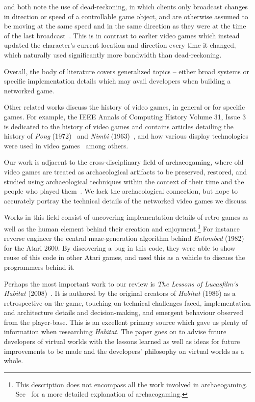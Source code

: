 \citet{Das1997NetEffect} and \citet{Blau1992NetworkedEnvironments} both note the use of dead-reckoning, in which clients only broadcast changes in direction or speed of a controllable game object, and are otherwise assumed to be moving at the same speed and in the same direction as they were at the time of the last broadcast~\cite{Blau1992NetworkedEnvironments}. This is in contrast to earlier video games which instead updated the character's current location and direction every time it changed, which naturally used significantly more bandwidth than dead-reckoning.

Overall, the body of literature covers generalized topics -- either broad systems or specific implementation details which may avail developers when building a networked game.

Other related works discuss the history of video games, in general or for specific games. For example, the IEEE Annals of Computing History Volume 31, Issue 3 is dedicated to the history of video games and contains articles detailing the history of \textit{Pong} (1972)~\cite{lowood} and \textit{Nimbi} (1963)~\cite{jorgensen}, and how various display technologies were used in video games~\cite{bogost} among others.

Our work is adjacent to the cross-disciplinary field of archaeogaming, where old video games are treated as archaeological artifacts to be preserved, restored, and studied using archaeological techniques within the context of their time and the people who played them~\cite{aycock}. We lack the archaeological connection, but hope to accurately portray the technical details of the networked video games we discuss.

Works in this field consist of uncovering implementation details of retro games as well as the human element behind their creation and enjoyment.\footnote{This description does not encompass all the work involved in archaeogaming. See~\cite{aycock} for a more detailed explanation of archaeogaming.}
For instance \citet{Aycock2018} reverse engineer the central maze-generation algorithm behind \textit{Entombed} (1982) for the Atari 2600. By discovering a bug in this code, they were able to show reuse of this code in other Atari games, and used this as a vehicle to discuss the programmers behind it.

Perhaps the most important work to our review is \textit{The Lessons of Lucasfilm's Habitat} (2008)~\cite{morningstar}. It is authored by the original creators of \textit{Habitat} (1986) as a retrospective on the game, touching on technical challenges faced, implementation and architecture details and decision-making, and emergent behaviour observed from the player-base. This is an excellent primary source which gave us plenty of information when researching \textit{Habitat}. The paper goes on to advise future developers of virtual worlds with the lessons learned as well as ideas for future improvements to be made and the developers' philosophy on virtual worlds as a whole.
